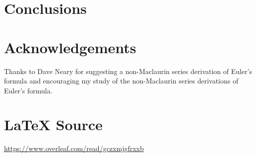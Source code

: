 \documentclass{article}
\theoremstyle{definition}
\begin{document}
\section{Conclusions}
%
%
%
\bigskip
\section{Acknowledgements}
Thanks to Dave Neary for suggesting a non-Maclaurin series 
derivation of Euler's formula and encouraging my study of 
the non-Maclaurin series derivations of Euler's formula.
%
%
\section*{\LaTeX \hspace{0.10 mm} Source}
\url{https://www.overleaf.com/read/gczxmjgfrxxb}
%
%
%


%
%
\end{document}
